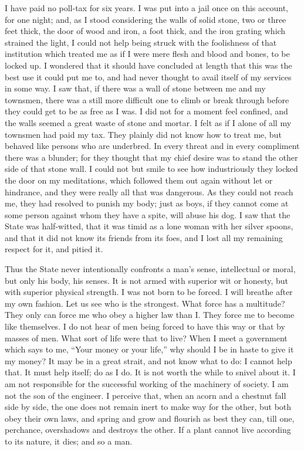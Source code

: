 \documentclass[letterpaper,12pt,english]{sphinxmanual}
\begin{document}
I have paid no poll-tax for six years. I was put into a jail once on this account, for one night; and, as I stood considering the walls of solid stone, two or three feet thick, the door of wood and iron, a foot thick, and the iron grating which strained the light, I could not help being struck with the foolishness of that institution which treated me as if I were mere flesh and blood and bones, to be locked up. I wondered that it should have concluded at length that this was the best use it could put me to, and had never thought to avail itself of my services in some way. I saw that, if there was a wall of stone between me and my townsmen, there was a still more difficult one to climb or break through before they could get to be as free as I was. I did not for a moment feel confined, and the walls seemed a great waste of stone and mortar. I felt as if I alone of all my townsmen had paid my tax. They plainly did not know how to treat me, but behaved like persons who are underbred. In every threat and in every compliment there was a blunder; for they thought that my chief desire was to stand the other side of that stone wall. I could not but smile to see how industriously they locked the door on my meditations, which followed them out again without let or hindrance, and they were really all that was dangerous. As they could not reach me, they had resolved to punish my body; just as boys, if they cannot come at some person against whom they have a spite, will abuse his dog. I saw that the State was half-witted, that it was timid as a lone woman with her silver spoons, and that it did not know its friends from its foes, and I lost all my remaining respect for it, and pitied it.

Thus the State never intentionally confronts a man's sense, intellectual or moral, but only his body, his senses. It is not armed with superior wit or honesty, but with superior physical strength. I was not born to be forced. I will breathe after my own fashion. Let us see who is the strongest. What force has a multitude? They only can force me who obey a higher law than I. They force me to become like themselves. I do not hear of men being forced to have this way or that by masses of men. What sort of life were that to live? When I meet a government which says to me, ``Your money or your life,'' why should I be in haste to give it my money? It may be in a great strait, and not know what to do: I cannot help that. It must help itself; do as I do. It is not worth the while to snivel about it. I am not responsible for the successful working of the machinery of society. I am not the son of the engineer. I perceive that, when an acorn and a chestnut fall side by side, the one does not remain inert to make way for the other, but both obey their own laws, and spring and grow and flourish as best they can, till one, perchance, overshadows and destroys the other. If a plant cannot live according to its nature, it dies; and so a man.
\end{document}
